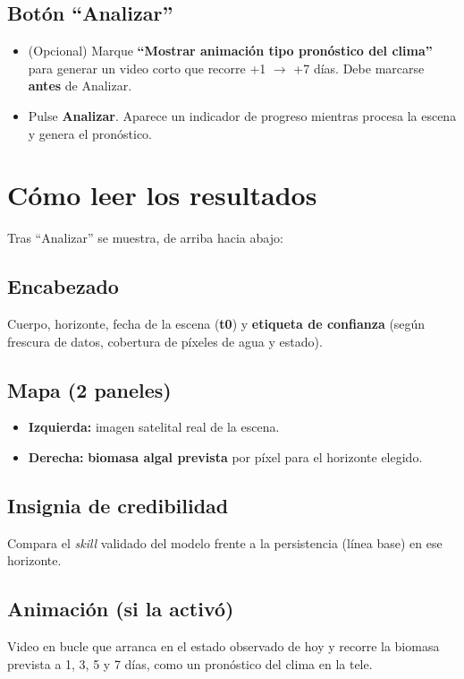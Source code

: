 \documentclass[11pt]{article}
\begin{document}
\subsection{Bot\'on ``Analizar''}
\begin{itemize}
  \item (Opcional) Marque \textbf{``Mostrar animaci\'on tipo pron\'ostico del clima''} para
  generar un video corto que recorre +1 $\rightarrow$ +7 d\'ias. Debe marcarse
  \textbf{antes} de Analizar.
  \item Pulse \textbf{Analizar}. Aparece un indicador de progreso mientras procesa la
  escena y genera el pron\'ostico.
\end{itemize}

\section{C\'omo leer los resultados}
Tras ``Analizar'' se muestra, de arriba hacia abajo:

\subsection{Encabezado}
Cuerpo, horizonte, fecha de la escena (\textbf{t0}) y \textbf{etiqueta de confianza}
(seg\'un frescura de datos, cobertura de p\'ixeles de agua y estado).

\subsection{Mapa (2 paneles)}
\begin{itemize}
  \item \textbf{Izquierda:} imagen satelital real de la escena.
  \item \textbf{Derecha:} \textbf{biomasa algal prevista} por p\'ixel para el horizonte elegido.
\end{itemize}

\subsection{Insignia de credibilidad}
Compara el \textit{skill} validado del modelo frente a la persistencia (l\'inea base) en
ese horizonte.

\subsection{Animaci\'on (si la activ\'o)}
Video en bucle que arranca en el estado observado de hoy y recorre la biomasa prevista a
1, 3, 5 y 7 d\'ias, como un pron\'ostico del clima en la tele.
\end{document}
